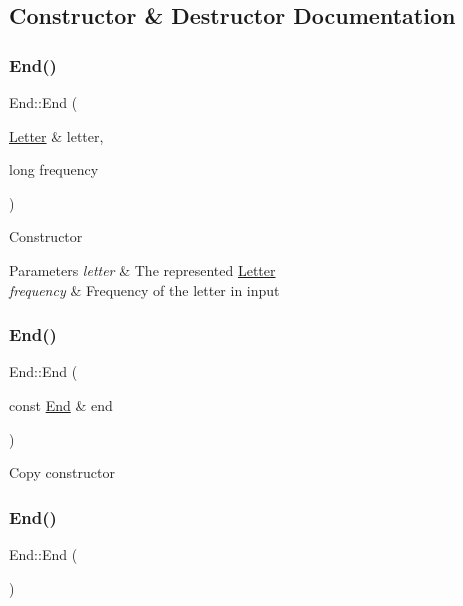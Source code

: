 \subsection{Constructor \& Destructor Documentation}
\mbox{\label{class_end_aec010332b2484030781dff4ab47156ce}} 
\subsubsection{\texorpdfstring{End()}{End()}\hspace{0.1cm}{\footnotesize\ttfamily [1/3]}}
{\footnotesize\ttfamily End\+::\+End (\begin{DoxyParamCaption}\item[{\hyperlink{class_letter}{Letter} \&}]{letter,  }\item[{long}]{frequency }\end{DoxyParamCaption})}

Constructor 
\begin{DoxyParams}{Parameters}
{\em letter} & The represented \hyperlink{class_letter}{Letter} \\
\hline
{\em frequency} & Frequency of the letter in input \\
\hline
\end{DoxyParams}
\mbox{\label{class_end_a9cdb20f0a78b188e13de7c4afc1a0bf4}} 
\subsubsection{\texorpdfstring{End()}{End()}\hspace{0.1cm}{\footnotesize\ttfamily [2/3]}}
{\footnotesize\ttfamily End\+::\+End (\begin{DoxyParamCaption}\item[{const \hyperlink{class_end}{End} \&}]{end }\end{DoxyParamCaption})}

Copy constructor \mbox{\label{class_end_acd25fa8f481c50f5b8eaff4af1159942}} 
\subsubsection{\texorpdfstring{End()}{End()}\hspace{0.1cm}{\footnotesize\ttfamily [3/3]}}
{\footnotesize\ttfamily End\+::\+End (\begin{DoxyParamCaption}{ }\end{DoxyParamCaption})}

